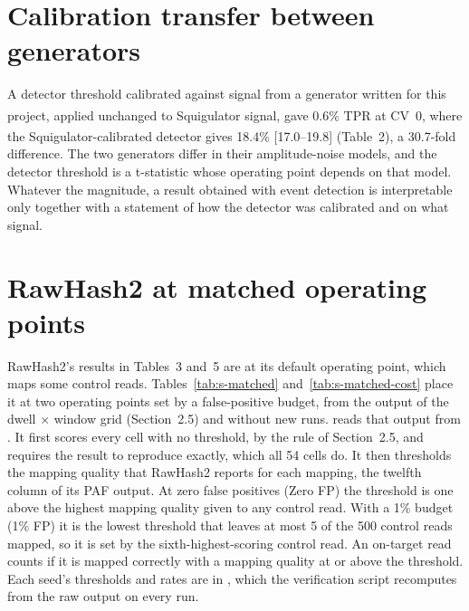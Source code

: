 \documentclass[11pt,a4paper]{article}
\newcommand{\prov}{\textsuperscript{\dag}}
\begin{document}
\section{Calibration transfer between generators}\label{sec:s-transfer}

A detector threshold calibrated against signal from a generator written for this project, applied
unchanged to Squigulator signal, gave 0.6\%\prov{} TPR at CV~0, where the Squigulator-calibrated
detector gives 18.4\% [17.0--19.8] (Table~2), a 30.7-fold\prov{} difference. The two generators
differ in their amplitude-noise models, and the detector threshold is a t-statistic whose operating
point depends on that model. Whatever the magnitude, a result obtained with event detection is
interpretable only together with a statement of how the detector was calibrated and on what signal.

\section{RawHash2 at matched operating points}\label{sec:s-matched}

RawHash2's results in Tables~3 and~5 are at its default operating point, which maps some control
reads. Tables~\ref{tab:s-matched} and~\ref{tab:s-matched-cost} place it at two operating points set
by a false-positive budget, from the output of the dwell $\times$ window grid (Section~2.5) and
without new runs.  reads that output from
. It first scores every cell with no threshold, by the
rule of Section~2.5, and requires the result to reproduce 
exactly, which all 54 cells do. It then thresholds the mapping quality that RawHash2 reports for
each mapping, the twelfth column of its PAF output. At zero false positives (Zero FP) the threshold
is one above the highest mapping quality given to any control read. With a 1\% budget (1\% FP) it is
the lowest threshold that leaves at most 5 of the 500 control reads mapped, so it is set by the
sixth-highest-scoring control read. An on-target read counts if it is mapped correctly with a
mapping quality at or above the threshold. Each seed's thresholds and rates are in
, which the verification script recomputes from the raw
output on every run.
\end{document}
